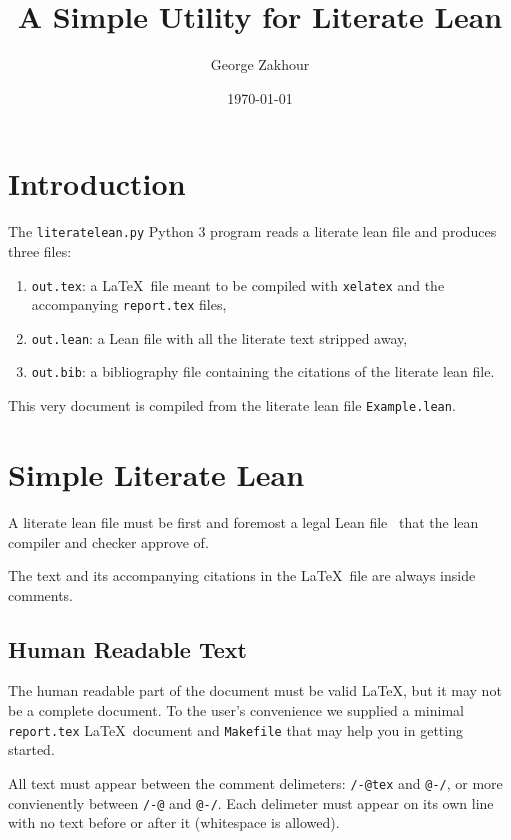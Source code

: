 
\title{A Simple Utility for Literate Lean}
\author{George Zakhour}
\date{\today}
\maketitle

\section{Introduction}

The \texttt{literatelean.py} Python 3 program reads a literate lean file and produces three files:

\begin{enumerate}
  \item \texttt{out.tex}: a \LaTeX~file meant to be compiled with \texttt{xelatex} and the accompanying \texttt{report.tex} files,
  \item \texttt{out.lean}: a Lean file with all the literate text stripped away,
  \item \texttt{out.bib}: a bibliography file containing the citations of the literate lean file.
\end{enumerate}

This very document is compiled from the literate lean file \texttt{Example.lean}.

\section{Simple Literate Lean}

A literate lean file must be first and foremost a legal Lean file~\cite{moura2021lean} that the lean compiler and checker approve of.

The text and its accompanying citations in the \LaTeX~file are always inside comments.

\subsection{Human Readable Text}

The human readable part of the document must be valid \LaTeX, but it may not be a complete document.
To the user's convenience we supplied a minimal \texttt{report.tex} \LaTeX~document and \texttt{Makefile} that may help you in getting started.

All text must appear between the comment delimeters: \texttt{/-@tex} and \texttt{@-/}, or more convienently between \texttt{/-@} and \texttt{@-/}.
Each delimeter must appear on its own line with no text before or after it (whitespace is allowed).

